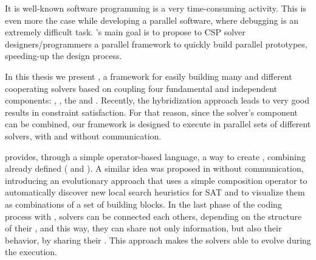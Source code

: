 It is well-known software programming is a very time-consuming activity. This is even more the case while developing a parallel software, where debugging is an extremely difficult task. \posl{}'s main goal is to propose to CSP solver designers/programmers a parallel framework to quickly build parallel prototypes, speeding-up the design process. 

In this thesis we present \posl, a framework for easily building many and different cooperating solvers based on coupling four fundamental and independent components: \oms, \opchs, the \ass{} and \comstrs. Recently, the hybridization approach leads to very good results in constraint satisfaction. For that reason, since the solver's component can be combined, our framework is designed to execute in parallel sets of different solvers, with and without communication.

\posl{} provides, through a simple operator-based language, a way to create \ass, combining already defined \ms{} (\oms{} and \opchs). A similar idea was proposed in \cite{Fukunaga2008} without communication, introducing an evolutionary approach that uses a simple composition operator to automatically discover new local search heuristics for SAT and to  visualize them as combinations of a set of building blocks. 
In the last phase of the coding process with \posl{}, solvers can be connected each others, depending on the structure of their \opchs, and this way, they can share not only information, but also their behavior, by sharing their \oms. This approach makes the solvers able to evolve during the execution.